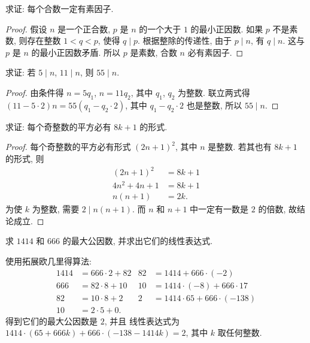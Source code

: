 \documentclass[a4paper,fleqn]{article}
\begin{document}
\begin{exmp}
    求证: 每个合数一定有素因子.
    \begin{proof}
        假设 $n$ 是一个正合数, $p$ 是 $n$ 的一个大于 $1$ 的最小正因数. 如果 $p$ 不是素数, 则存在整数 $1<q<p$,
        使得 $q\mid p$. 根据整除的传递性, 由于 $p\mid n$, 有 $q\mid n$. 这与 $p$ 是 $n$ 的最小正因数矛盾.
        所以 $p$ 是素数, 合数 $n$ 必有素因子.
    \end{proof}
\end{exmp}

\begin{exmp}
    求证: 若 $5\mid n$, $11\mid n$, 则 $55\mid n$.
    \begin{proof}
        由条件得 $n=5q_1$, $n=11q_2$, 其中 $q_1$, $q_2$ 为整数. 联立两式得 $(11-5\cdot2)n=55(q_1-q_2\cdot2)$,
        其中 $q_1-q_2\cdot2$ 也是整数, 所以 $55\mid n$.
    \end{proof}
\end{exmp}

\begin{exmp}
    求证: 每个奇整数的平方必有 $8k+1$ 的形式.
    \begin{proof}
        每个奇整数的平方必有形式 $(2n+1)^2$, 其中 $n$ 是整数. 若其也有 $8k+1$ 的形式, 则
        \begin{align*}
            (2n+1)^2  & =8k+1 \\
            4n^2+4n+1 & =8k+1 \\
            n(n+1)    & =2k.
        \end{align*}
        为使 $k$ 为整数, 需要 $2\mid n(n+1)$. 而 $n$ 和 $n+1$ 中一定有一数是 $2$ 的倍数, 故结论成立.
    \end{proof}
\end{exmp}

\begin{exmp}
    求 $1414$ 和 $666$ 的最大公因数, 并求出它们的线性表达式.
    \begin{solution}
        使用拓展欧几里得算法:
        \begin{align*}
            1414 & =666\cdot2+82 & 82 & =1414+666\cdot(-2)          \\
            666  & =82\cdot8+10  & 10 & =1414\cdot(-8)+666\cdot17   \\
            82   & =10\cdot8+2   & 2  & =1414\cdot65+666\cdot(-138) \\
            10   & =2\cdot5+0.
        \end{align*}
        得到它们的最大公因数是 $2$, 并且 线性表达式为 $1414\cdot(65+666k)+666\cdot(-138-1414k)=2$, 其中 $k$ 取任何整数.
    \end{solution}
\end{exmp}
\end{document}
